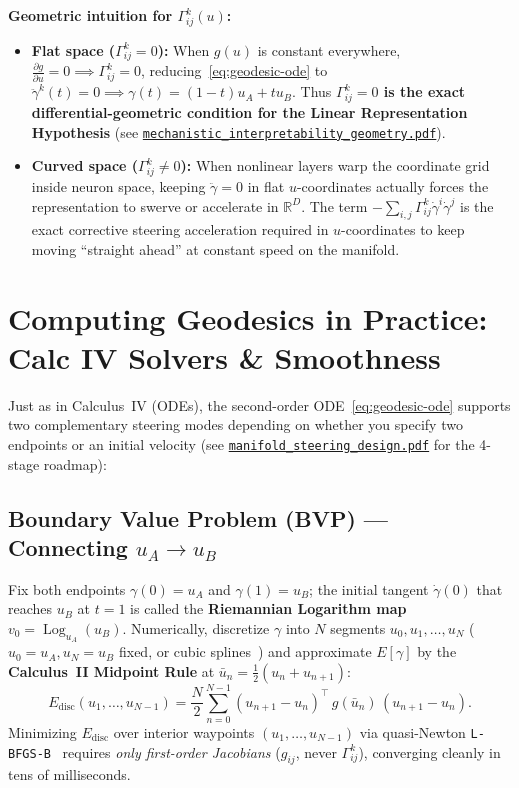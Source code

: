 \documentclass[11pt,a4paper]{article}
\newcommand{\R}{\mathbb{R}}
\DeclareMathOperator{\Log}{Log}
\theoremstyle{definition}
\begin{document}
\noindent
\textbf{Geometric intuition for $\Gamma^k_{ij}(u)$:}
\begin{itemize}[leftmargin=*]
    \item \textbf{Flat space ($\Gamma^k_{ij} = 0$):} When $g(u)$ is constant everywhere, $\frac{\partial g}{\partial u} = 0 \implies \Gamma^k_{ij} = 0$, reducing~\eqref{eq:geodesic-ode} to $\ddot{\gamma}^k(t) = 0 \implies \gamma(t) = (1-t)u_A + t u_B$. Thus \textbf{$\Gamma^k_{ij} = 0$ is the exact differential-geometric condition for the Linear Representation Hypothesis} (see \href{run:mechanistic_interpretability_geometry.pdf}{\texttt{mechanistic\_interpretability\_geometry.pdf}}).
    \item \textbf{Curved space ($\Gamma^k_{ij} \neq 0$):} When nonlinear layers warp the coordinate grid inside neuron space, keeping $\ddot{\gamma} = 0$ in flat $u$-coordinates actually forces the representation to swerve or accelerate in $\R^D$. The term $-\sum_{i,j}\Gamma^k_{ij}\dot{\gamma}^i\dot{\gamma}^j$ is the exact corrective steering acceleration required in $u$-coordinates to keep moving ``straight ahead'' at constant speed on the manifold.
\end{itemize}

\section{Computing Geodesics in Practice: Calc IV Solvers \& Smoothness}
\label{sec:solvers}

Just as in Calculus~IV (ODEs), the second-order ODE~\eqref{eq:geodesic-ode} supports two complementary steering modes depending on whether you specify two endpoints or an initial velocity (see \href{run:manifold_steering_design.pdf}{\texttt{manifold\_steering\_design.pdf}} for the 4-stage roadmap):

\subsection{Boundary Value Problem (BVP) --- Connecting \texorpdfstring{$u_A \to u_B$}{u\_A to u\_B}}

Fix both endpoints $\gamma(0) = u_A$ and $\gamma(1) = u_B$; the initial tangent $\dot{\gamma}(0)$ that reaches $u_B$ at $t=1$ is called the \textbf{Riemannian Logarithm map} $v_0 = \Log_{u_A}(u_B)$. Numerically, discretize $\gamma$ into $N$ segments $u_0, u_1, \dots, u_N$ ($u_0 = u_A, u_N = u_B$ fixed, or cubic splines~\cite{hauberg2019onlybayes}) and approximate $E[\gamma]$ by the \textbf{Calculus~II Midpoint Rule} at $\bar{u}_n = \frac{1}{2}(u_n + u_{n+1})$:
\begin{equation}
    E_{\mathrm{disc}}(u_1, \dots, u_{N-1}) = \frac{N}{2}\sum_{n=0}^{N-1} (u_{n+1} - u_n)^\top \, g(\bar{u}_n) \, (u_{n+1} - u_n).
    \label{eq:discrete-energy}
\end{equation}
Minimizing $E_{\mathrm{disc}}$ over interior waypoints $(u_1, \dots, u_{N-1})$ via quasi-Newton \texttt{L-BFGS-B}~\cite{virtanen2020scipy} requires \emph{only first-order Jacobians} ($g_{ij}$, never $\Gamma^k_{ij}$), converging cleanly in tens of milliseconds.
\end{document}
